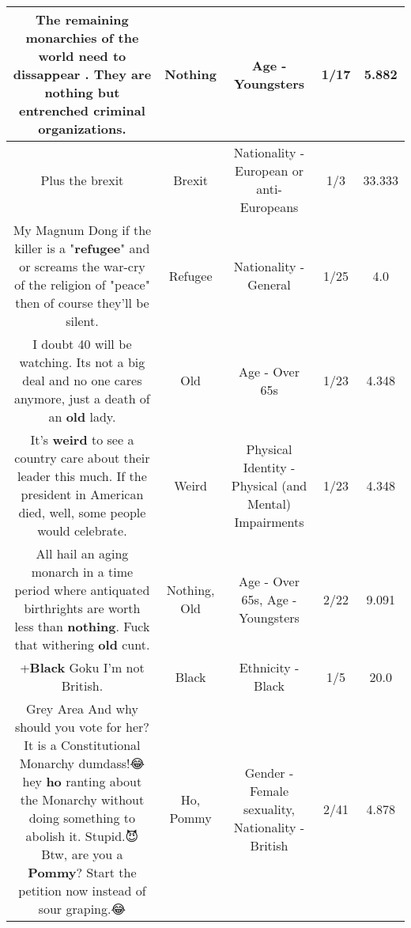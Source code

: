 \documentclass[11pt]{article}
\newlength\mylength
\begin{document}
\begin{center}
\begin{longtable}{|C{.65\mylength}|C{.30\mylength}|C{.12\mylength}|C{.12\mylength}|C{.12\mylength}|}
  \small The remaining monarchies of the world need to dissappear .  They are \textbf{nothing} but entrenched criminal organizations.\normalsize   & Nothing & Age - Youngsters & 1/17 & 5.882 \\  \hline
  \small Plus the brexit\normalsize   & Brexit & Nationality - European or anti-Europeans & 1/3 & 33.333 \\  \hline
  \small My Magnum Dong if the killer is a "\textbf{refugee}" and or screams the war-cry of the religion of "peace" then of course they'll be silent.\normalsize   & Refugee & Nationality - General & 1/25 & 4.0 \\  \hline
  \small I doubt 40 will be watching. Its not a big deal and no one cares anymore, just a death of an \textbf{old} lady.\normalsize   & Old & Age - Over 65s & 1/23 & 4.348 \\  \hline
  \small It's \textbf{weird} to see a country care about their leader this much. If the president in American died, well, some people would celebrate.\normalsize   & Weird & Physical Identity - Physical (and Mental) Impairments & 1/23 & 4.348 \\  \hline
  \small All hail an aging monarch in a time period where antiquated birthrights are worth less than \textbf{nothing}. Fuck that withering \textbf{old} cunt.\normalsize   & Nothing, Old & Age - Over 65s, Age - Youngsters & 2/22 & 9.091 \\  \hline
  \small +\textbf{Black} Goku  I'm not British.\normalsize   & Black & Ethnicity - Black & 1/5 & 20.0 \\  \hline
  \small Grey Area And why should you vote for her? It is a Constitutional Monarchy dumdass!😂 hey \textbf{ho} ranting about the Monarchy without doing something to abolish it. Stupid.😈 Btw, are you a \textbf{Pommy}? Start the petition now instead of sour graping.😂\normalsize   & Ho, Pommy & Gender - Female sexuality, Nationality - British & 2/41 & 4.878 \\  \hline

\end{longtable}
\end{center}
\end{document}
